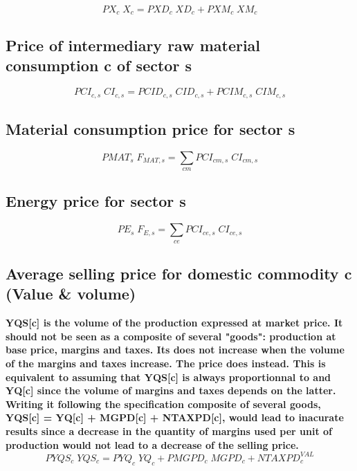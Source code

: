 \documentclass[12pt]{article}
\numberwithin{equation}{section}
\begin{document}
\begin{dmath}
PX_{c} \; X_{c} = PXD_{c} \; XD_{c} + PXM_{c} \; XM_{c}
\end{dmath}



\subsection{Price of intermediary raw material consumption c of sector s}


\begin{dmath}
PCI_{c, s} \; CI_{c, s} = PCID_{c, s} \; CID_{c, s} + PCIM_{c, s} \; CIM_{c, s}
\end{dmath}



\subsection{Material consumption price for sector s}


\begin{dmath}
PMAT_{s} \; F_{MAT, s} = \sum_{cm} PCI_{cm, s} \; CI_{cm, s}
\end{dmath}



\subsection{Energy price for sector s}


\begin{dmath}
PE_{s} \; F_{E, s} = \sum_{ce} PCI_{ce, s} \; CI_{ce, s}
\end{dmath}



\subsection{Average selling price for domestic commodity c (Value \& volume)}



\textbf{YQS[c] is the volume of the production expressed at market price. It should not be seen as a composite of several "goods": production at base price, margins and taxes. Its does not increase when the volume of the margins and taxes increase. The price does instead. This is equivalent to assuming that YQS[c] is always proportionnal to and YQ[c] since the volume of margins and taxes depends on the latter. Writing it following the specification composite of several goods, YQS[c] = YQ[c] + MGPD[c] + NTAXPD[c], would lead to inacurate results since a decrease in the quantity of margins used per unit of production would not lead to a decrease of the selling price.}
\begin{dmath}
PYQS_{c} \; YQS_{c} = PYQ_{c} \; YQ_{c} + PMGPD_{c} \; MGPD_{c} + NTAXPD^{VAL}_{c}
\end{dmath}
\end{document}
